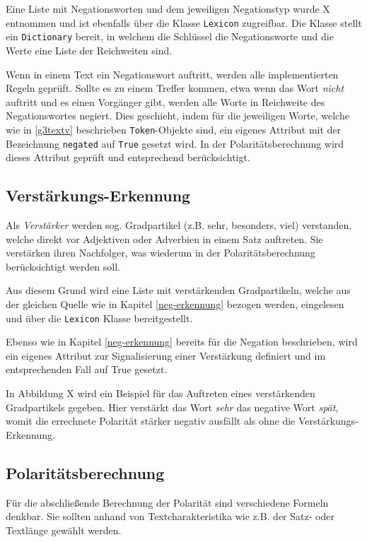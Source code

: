Eine Liste mit Negationsworten und dem jeweiligen Negationstyp wurde X entnommen und ist ebenfalls über die Klasse \texttt{Lexicon} zugreifbar. 
Die Klasse stellt ein \texttt{Dictionary} bereit, in welchem die Schlüssel die Negationsworte und die Werte eine Liste der Reichweiten sind. 

Wenn in einem Text ein Negationswort auftritt, werden alle implementierten Regeln geprüft. 
Sollte es zu einem Treffer kommen, etwa wenn das Wort \textit{nicht} auftritt und es einen Vorgänger gibt, werden alle Worte in Reichweite des Negationswortes negiert. 
Dies geschieht, indem für die jeweiligen Worte, welche wie in \ref{g3textv} beschrieben \texttt{Token}-Objekte sind, ein eigenes Attribut mit der Bezeichnung \texttt{negated} auf \texttt{True} gesetzt wird. 
In der Polaritätsberechnung wird dieses Attribut geprüft und entsprechend berücksichtigt. 

\subsection{Verstärkungs-Erkennung}
\label{ver-erkennung}
Als \textit{Verstärker} werden sog. Gradpartikel (z.B. sehr, besonders, viel) verstanden, welche direkt vor Adjektiven oder Adverbien in einem Satz auftreten. 
Sie verstärken ihren Nachfolger, was wiederum in der Polaritätsberechnung berücksichtigt werden soll. 

Aus diesem Grund wird eine Liste mit verstärkenden Gradpartikeln, welche aus der gleichen Quelle wie in Kapitel \ref{neg-erkennung} bezogen werden, eingelesen und über die \texttt{Lexicon} Klasse bereitgestellt. 

Ebenso wie in Kapitel \ref{neg-erkennung} bereits für die Negation beschrieben, wird ein eigenes Attribut zur Signalisierung einer Verstärkung definiert und im entsprechenden Fall auf True gesetzt. 

In Abbildung X wird ein Beispiel für das Auftreten eines verstärkenden Gradpartikels gegeben. 
Hier verstärkt das Wort \textit{sehr} das negative Wort \textit{spät}, womit die errechnete Polarität stärker negativ ausfällt als ohne die Verstärkungs-Erkennung. 

\subsection{Polaritätsberechnung}
\label{polberechnung}
Für die abschließende Berechnung der Polarität sind verschiedene Formeln denkbar. 
Sie sollten anhand von Textcharakteristika wie z.B. der Satz- oder Textlänge gewählt werden. 

